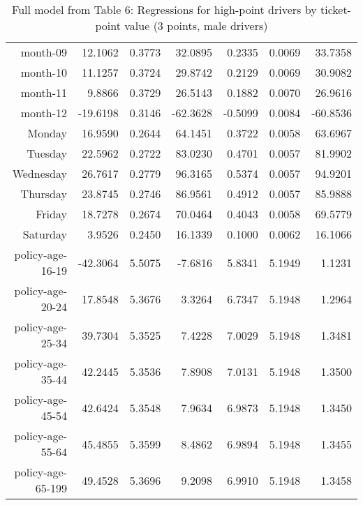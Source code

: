 \documentclass[10pt]{article}
\begin{document}
\begin{table}[ht]
\begin{tabular}{rrrrrrr}
  month-09 & 12.1062 & 0.3773 & 32.0895 & 0.2335 & 0.0069 & 33.7358 \\ 
  month-10 & 11.1257 & 0.3724 & 29.8742 & 0.2129 & 0.0069 & 30.9082 \\ 
  month-11 & 9.8866 & 0.3729 & 26.5143 & 0.1882 & 0.0070 & 26.9616 \\ 
  month-12 & -19.6198 & 0.3146 & -62.3628 & -0.5099 & 0.0084 & -60.8536 \\ 
  Monday & 16.9590 & 0.2644 & 64.1451 & 0.3722 & 0.0058 & 63.6967 \\ 
  Tuesday & 22.5962 & 0.2722 & 83.0230 & 0.4701 & 0.0057 & 81.9902 \\ 
  Wednesday & 26.7617 & 0.2779 & 96.3165 & 0.5374 & 0.0057 & 94.9201 \\ 
  Thursday & 23.8745 & 0.2746 & 86.9561 & 0.4912 & 0.0057 & 85.9888 \\ 
  Friday & 18.7278 & 0.2674 & 70.0464 & 0.4043 & 0.0058 & 69.5779 \\ 
  Saturday & 3.9526 & 0.2450 & 16.1339 & 0.1000 & 0.0062 & 16.1066 \\ 
  policy-age-16-19 & -42.3064 & 5.5075 & -7.6816 & 5.8341 & 5.1949 & 1.1231 \\ 
  policy-age-20-24 & 17.8548 & 5.3676 & 3.3264 & 6.7347 & 5.1948 & 1.2964 \\ 
  policy-age-25-34 & 39.7304 & 5.3525 & 7.4228 & 7.0029 & 5.1948 & 1.3481 \\ 
  policy-age-35-44 & 42.2445 & 5.3536 & 7.8908 & 7.0131 & 5.1948 & 1.3500 \\ 
  policy-age-45-54 & 42.6424 & 5.3548 & 7.9634 & 6.9873 & 5.1948 & 1.3450 \\ 
  policy-age-55-64 & 45.4855 & 5.3599 & 8.4862 & 6.9894 & 5.1948 & 1.3455 \\ 
  policy-age-65-199 & 49.4528 & 5.3696 & 9.2098 & 6.9910 & 5.1948 & 1.3458 \\ 
   \hline
\end{tabular}
\caption{Full model from Table 6: Regressions for high-point drivers by ticket-point value (3 points, male drivers)} 
\label{tab_6_3_pts_M}
\end{table}


\clearpage
\pagebreak



\end{document}
